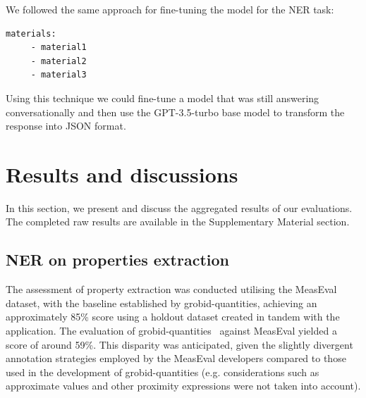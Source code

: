 \documentclass[a4paper]{article}
\begin{document}
We followed the same approach for fine-tuning the model for the NER task: 

\begin{lstlisting}[caption=Example format of the expected answer for the NER task]
    materials: 
     - material1
     - material2
     - material3
\end{lstlisting}

Using this technique we could fine-tune a model that was still answering conversationally and then use the GPT-3.5-turbo base model to transform the response into JSON format. 


\section{Results and discussions}
\label{sec:results}
In this section, we present and discuss the aggregated results of our evaluations. The completed raw results are available in the Supplementary Material section. 

\subsection{NER on properties extraction}
\label{sec:results-ner-properties}

The assessment of property extraction was conducted utilising the MeasEval dataset, with the baseline established by grobid-quantities, achieving an approximately 85\% score using a holdout dataset created in tandem with the application. 
The evaluation of grobid-quantities~\cite{foppiano2019quantities} against MeasEval yielded a score of around 59\%. This disparity was anticipated, given the slightly divergent annotation strategies employed by the MeasEval developers compared to those used in the development of grobid-quantities (e.g. considerations such as approximate values and other proximity expressions were not taken into account). 
\end{document}
